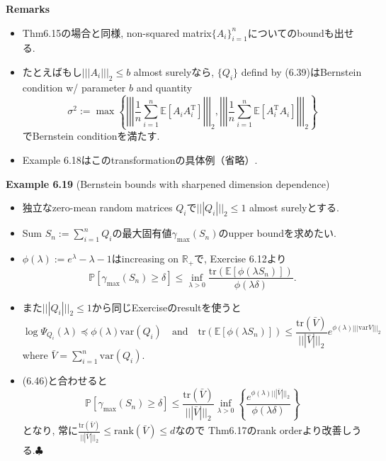 \documentclass[unicode,aspectratio=169,11pt]{beamer}
\def\endexample{\hfill $\clubsuit$}
\newcommand{\ex}{\mathbb{E}}
\newcommand{\var}{\mathrm{var}}
\newcommand{\bb}{\mathbb}
\newcommand{\tr}{\mathrm{T}}
\newcommand{\trace}{\mathrm{tr}}
\begin{document}
\begin{frame}{}{}
  {\bf Remarks}
  \begin{itemize}
    \item Thm6.15の場合と同様, non-squared matrix$\{A_i\}_{i=1}^n$についてのboundも出せる.
    \item たとえばもし$|||A_i|||_2 \le b$ almost surelyなら, $\{Q_i\}$ defind by (6.39)はBernstein condition w/ parameter $b$ and quantity
          \[
            \sigma^2
            := \max\left\{ \left|\left|\left|\frac{1}{n}\sum_{i=1}^n\ex[A_iA_i^\tr]\right|\right|\right|_2, \left|\left|\left|\frac{1}{n}\sum_{i=1}^n\ex[A_i^\tr A_i]\right|\right|\right|_2 \right\}
          \]
          でBernstein conditionを満たす.
    \item Example 6.18はこのtransformationの具体例（省略）.
  \end{itemize}
\end{frame}

\begin{frame}{}{}
  {\bf Example 6.19} (Bernstein bounds with sharpened dimension dependence)
  \begin{itemize}
    \item 独立なzero-mean random matrices $Q_i$で$|||Q_i|||_2 \le 1$ almost surelyとする.
    \item Sum $S_n := \sum_{i=1}^n Q_i$の最大固有値$\gamma_{\max}(S_n)$のupper boundを求めたい.
    \item $\phi(\lambda) := e^\lambda - \lambda - 1$はincreasing on $\mathbb{R}_+$で, Exercise 6.12より
          \[
            \bb{P}[\gamma_{\max}(S_n) \ge \delta] \le \inf_{\lambda > 0}\frac{\trace(\ex[\phi(\lambda S_n)])}{\phi(\lambda \delta)}.
            \tag{6.46}
          \]
    \item また$|||Q_i|||_2 \le 1$から同じExerciseのresultを使うと
          \[
            \log \Psi_{Q_i}(\lambda) \preceq \phi(\lambda) \var(Q_i)
            \quad \mathrm{and} \quad
            \trace(\ex[\phi(\lambda S_n)]) \le \frac{\trace(\bar{V})}{||| \bar{V}|||_2} e^{\phi(\lambda)|||\var{V}|||_2}
            \tag{6.47}
          \]
          where $\bar{V} = \sum_{i=1}^n\var(Q_i)$.
      \item (6.46)と合わせると
          {\small\[
            \bb{P}[\gamma_{\max}(S_n) \ge \delta]
            \le \frac{\trace(\bar{V})}{||| \bar{V}|||_2} \inf_{\lambda > 0}\left\{\frac{e^{\phi(\lambda)|||\bar{V}|||_2}}{\phi(\lambda \delta)}\right\}
            \tag{6.48}
          \]}
          となり, 常に$\frac{\trace(\bar{V})}{||| \bar{V}|||_2} \le \mathrm{rank}(\bar{V}) \le d$なので Thm6.17のrank orderより改善しうる.\endexample
  \end{itemize}
\end{frame}
\end{document}
